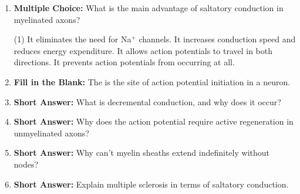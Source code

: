 \begin{enumerate}[label=\textbf{Q2.3.\arabic*}]
\newpage
      



            \item \textbf{Multiple Choice:} What is the main advantage of saltatory conduction in myelinated axons?
            \begin{tasks}[label=\textcolor{\documentTheme}{(\Alph*)}, item-format=\color{\documentTheme}, label-width=1.5em, item-indent=1.7em](1)
                  \task It eliminates the need for Na\(^+\) channels.
                  \task It increases conduction speed and reduces energy expenditure.
                  \task It allows action potentials to travel in both directions.
                  \task It prevents action potentials from occurring at all.
            \end{tasks}
            
      \item \textbf{Fill in the Blank:} The \underline{\hspace{3cm}} is the site of action potential initiation in a neuron. \\

      \item \textbf{Short Answer:} What is decremental conduction, and why does it occur? \\

      \item \textbf{Short Answer:} Why does the action potential require active regeneration in unmyelinated axons? \\

      \item \textbf{Short Answer:} Why can't myelin sheaths extend indefinitely without nodes? \\

      \item \textbf{Short Answer:} Explain multiple sclerosis in terms of saltatory conduction. \\

\end{enumerate}

